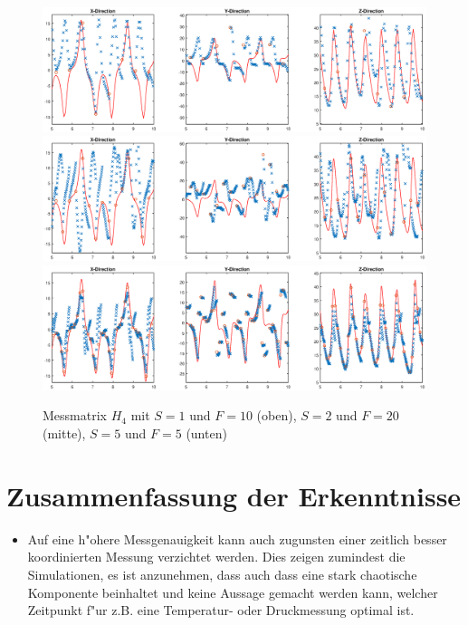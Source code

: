 \begin{refsection}
\begin{figure}
\centering
\includegraphics[width=\hsize]{kalman/figures/H4R10S1.eps}
\includegraphics[width=\hsize]{kalman/figures/H4R20S2.eps}
\includegraphics[width=\hsize]{kalman/figures/H4R05S5.eps}
\caption{Messmatrix $H_{4}$ mit $S=1$ und $F=10$ (oben), $S=2$ und $F=20$ (mitte), $S=5$ und $F=5$ (unten)}
\label{kalman:H4}
\end{figure}

\section{Zusammenfassung der Erkenntnisse}

\begin{itemize}


\item
Auf eine h"ohere Messgenauigkeit kann auch zugunsten einer zeitlich besser koordinierten Messung verzichtet werden. Dies zeigen zumindest die Simulationen, es ist anzunehmen, dass auch dass eine stark chaotische Komponente beinhaltet und keine Aussage gemacht werden kann, welcher Zeitpunkt f"ur z.B. eine Temperatur- oder Druckmessung optimal ist. 


\end{itemize}
\end{refsection}
